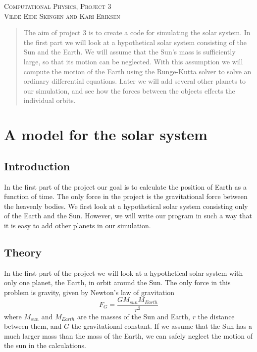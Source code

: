 \documentclass[a4paper,12pt, english]{article}
\begin{document}
\begin{titlepage}
\begin{center}
\textsc{\Large Computational Physics, Project 3}\\[0.5cm]
\textsc{Vilde Eide Skingen and Kari Eriksen}\\[0.5cm]

\end{center}
\end{titlepage}

\begin{abstract}
The aim of project 3 is to create a code for simulating the solar system. In the first part we will look at a hypothetical solar system consisting of the Sun and the Earth. We will assume that the Sun's mass is sufficiently large, so that its motion can be neglected. With this assumption we will compute the motion of the Earth using the Runge-Kutta solver to solve an ordinary differential equations. Later we will add several other planets to our simulation, and see how the forces between the objects effects the individual orbits.   
\end{abstract}

\section*{A model for the solar system}

\subsection*{Introduction}
In the first part of the project our goal is to calculate the position of Earth as a function of time. The only force in the project is the gravitational force between the heavenly bodies. We first look at a hypothetical solar system consisting only of the Earth and the Sun. However, we will write our program in such a way that it is easy to add other planets in our simulation. 

\subsection*{Theory}

In the first part of the project we will look at a hypothetical solar system with only one planet, the Earth, in orbit around the Sun. The only force in this problem is gravity, given by Newton's law of gravitation $$ F_G = \frac{GM_{sun}M_{Earth}}{r^2} $$
where $M_{sun}$ and $M_{Earth}$ are the masses of the Sun and Earth, $r$ the distance between them, and $G$ the gravitational constant. If we assume that the Sun has a much larger mass than the mass of the Earth, we can safely neglect the motion of the sun in the calculations. 
\end{document}
